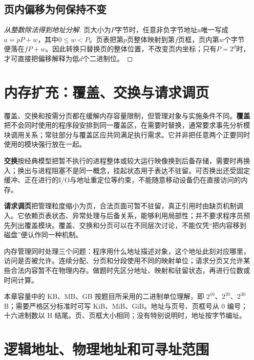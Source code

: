 \subsection{页内偏移为何保持不变}\label{OS03-offset-proof}

\begin{proof}[从整数除法得到地址分解]

页大小为\(P\)字节时，任意非负字节地址\(a\)唯一写成\(a=pP+w\)，其中\(0\le w<P\)。页表把第\(p\)页整体映射到第\(f\)页框，页内第\(w\)个字节便落在\(fP+w\)。因此转换只替换页的整体位置，不改变页内坐标；只有\(P=2^d\)时，才可直接把偏移解释为低\(d\)个二进制位。

\end{proof}

\section{内存扩充：覆盖、交换与请求调页}\label{OS03-extension}

覆盖、交换和按需分页都在缓解内存容量限制，但管理对象与实施条件不同。\textbf{覆盖}把不会同时使用的程序段安排到同一覆盖区，在需要时替换，通常要求事先分析模块调用关系；常驻部分与覆盖区应共同满足执行需求。它并非把任意两个正要同时使用的模块强行放在一起。

\textbf{交换}按经典模型把暂不执行的进程整体或较大运行映像换到后备存储，需要时再换入；换出与进程阻塞不是同一概念，挂起状态用于表达不驻留。可否换出还受固定缓冲、正在进行的I/O与地址重定位等约束，不能随意移动设备仍在直接访问的内存。

\textbf{请求调页}把管理粒度缩小为页，合法页面可暂不驻留，真正引用时由缺页机制调入。它依赖页表状态、异常处理与后备关系，能够利用局部性；并不要求程序员预先列出覆盖模块。覆盖、交换和分页可以在不同层次讨论，不能仅凭``把内容移到磁盘''便认作同一种机制。

内存管理同时处理三个问题：程序用什么地址描述对象，这个地址此刻对应哪里，访问是否被允许。连续分配、分页和分段使用不同的映射单位；请求分页又允许某些合法内容暂不在物理内存。做题时先区分地址、映射和驻留状态，再进行位数或时间计算。

本章容量中的 KB、MB、GB 按题目所采用的二进制单位理解，即 \(2^{10}\)、\(2^{20}\)、\(2^{30}\) B；需要严格区分标准时可写 KiB、MiB、GiB。地址与页号、页框号从 0 编号；十六进制数以 H 结尾。页、页框大小相同；没有特别说明时，地址按字节编址。

\section{逻辑地址、物理地址和可寻址范围}\label{OS03-5-1}

